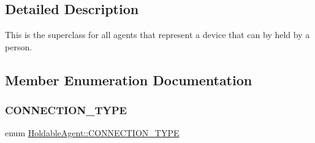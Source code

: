 \subsection{Detailed Description}
This is the superclass for all agents that represent a device that can by held by a person. 

\subsection{Member Enumeration Documentation}
\mbox{\label{class_holdable_agent_ae2c334b004d7b9c5a999cf2618e4e518}} 
\subsubsection{\texorpdfstring{C\+O\+N\+N\+E\+C\+T\+I\+O\+N\+\_\+\+T\+Y\+PE}{CONNECTION\_TYPE}}
{\footnotesize\ttfamily enum \hyperlink{class_holdable_agent_ae2c334b004d7b9c5a999cf2618e4e518}{Holdable\+Agent\+::\+C\+O\+N\+N\+E\+C\+T\+I\+O\+N\+\_\+\+T\+Y\+PE}}

